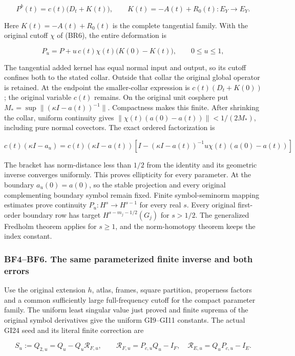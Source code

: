 \documentclass[
  11pt,
]{article}
\begin{document}
\[
 P^b(t)=c(t)\bigl(D_t+K(t)\bigr),\qquad
 K(t)=-A(t)+R_0(t):E_Y\to E_Y.
 \tag{BF1}
\]

Here \(K(t)=-A(t)+R_0(t)\) is the complete tangential family. With the
original cutoff \(\chi\) of (BR6), the entire deformation is

\[
 P_u=P+u\,c(t)\chi(t)\bigl(K(0)-K(t)\bigr),\qquad0\le u\le1,
 \tag{BF2}
\]

The tangential added kernel has equal normal input and output, so its
cutoff confines both to the stated collar. Outside that collar the
original global operator is retained. At the endpoint the smaller-collar
expression is \(c(t)(D_t+K(0))\); the original variable \(c(t)\)
remains. On the original unit cosphere put
\(M_* =\sup\|(\kappa I-a(t))^{-1}\|\). Compactness makes this finite.
After shrinking the collar, uniform continuity gives
\(\|\chi(t)(a(0)-a(t))\|<1/(2M_*)\), including pure normal covectors.
The exact ordered factorization is

\[
 c(t)(\kappa I-a_u)
 =c(t)(\kappa I-a(t))
  \left[I-(\kappa I-a(t))^{-1}u\chi(t)(a(0)-a(t))\right]
 \tag{BF3}
\]

The bracket has norm-distance less than \(1/2\) from the identity and
its geometric inverse converges uniformly. This proves ellipticity for
every parameter. At the boundary \(a_u(0)=a(0)\), so the stable
projection and every original complementing boundary symbol remain
fixed. Finite symbol-seminorm mapping estimates prove continuity
\(P_u:H^s\to H^{s-1}\) for every real \(s\). Every original first-order
boundary row has target \(H^{s-m_j-1/2}(G_j)\) for \(s>1/2\). The
generalized Fredholm theorem applies for \(s\ge1\), and the
norm-homotopy theorem keeps the index constant.

\subsubsection{BF4--BF6. The same parameterized finite inverse and both
errors}\label{bf4bf6.-the-same-parameterized-finite-inverse-and-both-errors}

Use the original extension \(h\), atlas, frames, square partition,
properness factors and a common sufficiently large full-frequency cutoff
for the compact parameter family. The uniform least singular value just
proved and finite suprema of the original symbol derivatives give the
uniform GI9--GI11 constants. The actual GI24 seed and its literal finite
correction are

\[
 S_u:=Q_{2,u}=Q_u-Q_u\mathcal R_{F,u},\qquad
 \mathcal R_{F,u}=P_{c,u}Q_u-I_F,\quad
 \mathcal R_{E,u}=Q_uP_{c,u}-I_E.
 \tag{BF4}
\]
\end{document}
